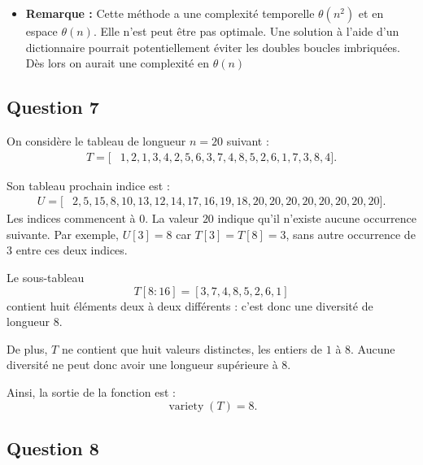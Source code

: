 \documentclass{article}
\begin{document}
\begin{itemize}
    \item \textbf{Remarque :} Cette méthode a une complexité temporelle $\theta(n^2)$ et en espace $\theta(n)$. 
    \subitem Elle n'est peut être pas optimale. Une solution à l'aide d'un dictionnaire pourrait potentiellement éviter les doubles boucles imbriquées. Dès lors on aurait une complexité en $\theta(n)$ 
\end{itemize}

\subsection*{Question 7}

On considère le tableau de longueur $n=20$ suivant :
\[
\begin{aligned}
T = [&1,2,1,3,4,2,5,6,3,7,4,8,5,2,6,1,7,3,8,4].
\end{aligned}
\]

Son tableau prochain indice est :
\[
\begin{aligned}
U = [&2,5,15,8,10,13,12,14,17,16,19,18,20,20,20,20,20,20,20,20].
\end{aligned}
\]
Les indices commencent à $0$. La valeur $20$ indique
qu'il n'existe aucune occurrence suivante.
Par exemple, $U[3]=8$ car $T[3]=T[8]=3$,
sans autre occurrence de $3$ entre ces deux indices.

Le sous-tableau
\[
T[8:16]=[3,7,4,8,5,2,6,1]
\]
contient huit éléments deux à deux différents :
c'est donc une diversité de longueur $8$.

De plus, $T$ ne contient que huit valeurs distinctes,
les entiers de $1$ à $8$. Aucune diversité ne peut
donc avoir une longueur supérieure à $8$.

Ainsi, la sortie de la fonction est :
\[
\boxed{\operatorname{variety}(T)=8}.
\]

\subsection*{Question 8}
\end{document}
